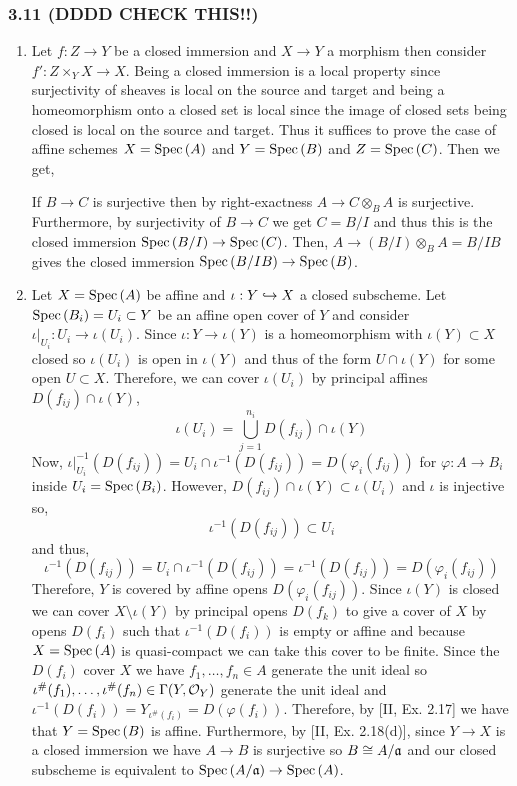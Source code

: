 \documentclass[12pt]{article}
\begin{document}
\subsubsection{3.11 (DDDD CHECK THIS!!)}

\begin{enumerate}
\item Let $f : Z \to Y$ be a closed immersion and $X \to Y$ a morphism then consider $f' : Z \times_Y X \to X$. Being a closed immersion is a local property since surjectivity of sheaves is local on the source and target and being a homeomorphism onto a closed set is local since the image of closed sets being closed is local on the source and target. Thus it suffices to prove the case of affine schemes $X = \mathrm{Spec}\left( A \right)$ and $Y = \mathrm{Spec}\left( B \right)$ and $Z = \mathrm{Spec}\left( C \right)$. Then we get,
\begin{center}
\end{center}
If $B \to C$ is surjective then by right-exactness $A \to C \otimes_B A$ is surjective. Furthermore, by surjectivity of $B \to C$ we get $C = B / I$ and thus this is the closed immersion 
$\mathrm{Spec}\left( B/I \right) \to \mathrm{Spec}\left( C \right)$. Then, $A \to (B / I) \otimes_B A = B / I B$ gives the closed immersion $\mathrm{Spec}\left( B / I B \right) \to \mathrm{Spec}\left( B \right)$.

\item Let $X = \mathrm{Spec}\left( A \right)$ be affine and $\iota : Y \hookrightarrow X$ a closed subscheme. Let $\mathrm{Spec}\left( B_i \right) = U_i \subset Y$ be an affine open cover of $Y$ and consider $\iota|_{U_i} : U_i \to \iota(U_i)$. Since $\iota : Y \to \iota(Y)$ is a homeomorphism with $\iota(Y) \subset X$ closed so $\iota(U_i)$ is open in $\iota(Y)$ and thus of the form $U \cap \iota(Y)$ for some open $U \subset X$. Therefore, we can cover $\iota(U_i)$ by principal affines $D(f_{ij}) \cap \iota(Y)$,
\[ \iota(U_i) = \bigcup_{j = 1}^{n_i} D(f_{ij}) \cap \iota(Y) \]
Now, $\iota|_{U_i}^{-1}(D(f_{ij})) = U_i \cap \iota^{-1}(D(f_{ij})) = D(\varphi_i(f_{ij}))$ for $\varphi : A \to B_i$ inside $U_i = \mathrm{Spec}\left( B_i \right)$. However, $D(f_{ij}) \cap \iota(Y) \subset \iota(U_i)$ and $\iota$ is injective so,
\[ \iota^{-1}(D(f_{ij})) \subset U_i \]
and thus,
\[ \iota^{-1}(D(f_{ij})) = U_i \cap \iota^{-1}(D(f_{ij})) = \iota^{-1}(D(f_{ij})) = D(\varphi_i(f_{ij})) \]
Therefore, $Y$ is covered by affine opens $D(\varphi_i(f_{ij}))$.
Since $\iota(Y)$ is closed we can cover $X \setminus \iota(Y)$ by principal opens $D(f_k)$ to give a cover of $X$ by opens $D(f_i)$ such that $\iota^{-1}(D(f_i))$ is empty or affine and because $X = \mathrm{Spec}\left( A \right)$ is quasi-compact we can take this cover to be finite. Since the $D(f_i)$ cover $X$ we have $f_1, \dots, f_n \in A$ generate the unit ideal so $\iota^\#(f_1), \dots, \iota^\#(f_n) \in \Gamma(Y, \mathcal{O}_{Y})$ generate the unit ideal and $\iota^{-1}(D(f_i)) = Y_{\iota^\#(f_i)} = D(\varphi(f_i))$. Therefore, by [II, Ex. 2.17] we have that $Y = \mathrm{Spec}\left( B \right)$ is affine. Furthermore, by [II, Ex. 2.18(d)], since $Y \to X$ is a closed immersion we have $A \to B$ is surjective so $B \cong A / \mathfrak{a}$ and our closed subscheme is equivalent to $\mathrm{Spec}\left( A / \mathfrak{a} \right) \to \mathrm{Spec}\left( A \right)$.  


\end{enumerate}
\end{document}
